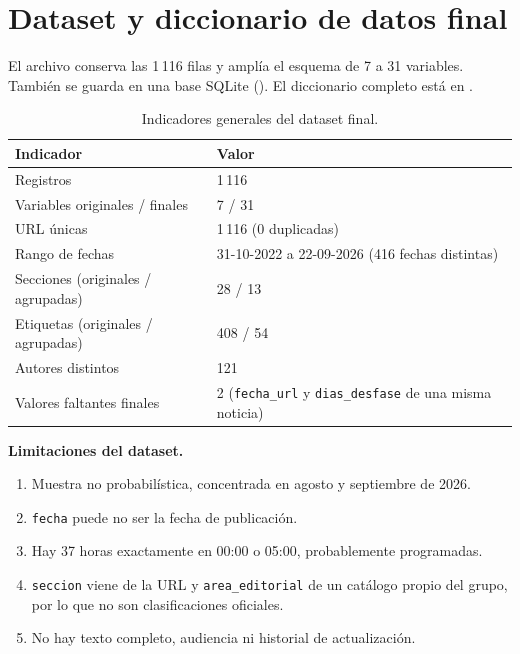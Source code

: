 \documentclass[12pt,a4paper]{article}
\begin{document}
\section{Dataset y diccionario de datos final}
El archivo  conserva las 1\,116 filas y amplía el esquema de 7 a 31 variables. También se guarda en una base SQLite (). El diccionario completo está en .

\begin{table}[H]\centering
\caption{Indicadores generales del dataset final.}
\begin{tabular}{p{7cm}p{7.5cm}}
\toprule
\textbf{Indicador} & \textbf{Valor}\\\midrule
Registros & 1\,116\\
Variables originales / finales & 7 / 31\\
URL únicas & 1\,116 (0 duplicadas)\\
Rango de fechas & 31-10-2022 a 22-09-2026 (416 fechas distintas)\\
Secciones (originales / agrupadas) & 28 / 13\\
Etiquetas (originales / agrupadas) & 408 / 54\\
Autores distintos & 121\\
Valores faltantes finales & 2 (\texttt{fecha\_url} y \texttt{dias\_desfase} de una misma noticia)\\
\bottomrule
\end{tabular}
\end{table}

\textbf{Limitaciones del dataset.}
\begin{enumerate}
\item Muestra no probabilística, concentrada en agosto y septiembre de 2026.
\item \texttt{fecha} puede no ser la fecha de publicación.
\item Hay 37 horas exactamente en 00:00 o 05:00, probablemente programadas.
\item \texttt{seccion} viene de la URL y \texttt{area\_editorial} de un catálogo propio del grupo, por lo que no son clasificaciones oficiales.
\item No hay texto completo, audiencia ni historial de actualización.
\end{enumerate}

\end{document}
